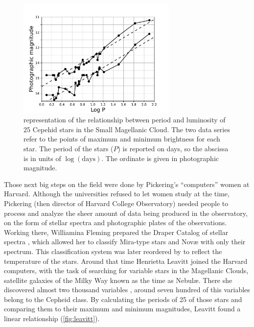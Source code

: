 \begin{figure}
	\centering
	\includegraphics[width=0.7\textwidth]{img/leavitt.pdf}
	\caption[Leavitt PL relation]{\cite{Leavitt1912} representation of the relationship between period and luminosity 
	of 25 Cepehid stars in the Small Magellanic Cloud.
	The two data series refer to the points of maximum and minimum brightness for each star. 
	The period of the stars ($P$) is reported on days, so the abscissa is in units of $\log(\text{days})$.
	The ordinate is given in photographic magnitude.
	}
	\label{fig:leavitt}
\end{figure}

Those next big steps on the field were done by Pickering's ``computers'' women at Harvard. 
Although the universities refused to let women study at the time, Pickering (then director of Harvard College Observatory) 
needed people to process and analyze the sheer amount of data being produced in the observatory, 
on the form of stellar spectra and photographic plates of the observations.
Working there, Williamina Fleming prepared the Draper Catalog of stellar spectra \citep{Pickering1890,Maury1897}, 
which allowed her to classify Mira-type stars and Nov\ae{} with only their spectrum. 
This classification system was later reordered by \cite{Canon1901} to reflect the temperature of the stars.
Around that time Henrietta Leavitt joined the Harvard computers, 
with the task of searching for variable stars in the Magellanic Clouds, satellite galaxies of the Milky Way known as the time as Nebul\ae{}.
There she discovered almost two thousand variables \citep{Leavitt1908}, around seven hundred of this variables belong to the Cepheid class. 
By calculating the periods of 25 of those stars and comparing them to their maximum and minimum magnitudes, Leavitt found a linear relationship (\autoref{fig:leavitt}).


